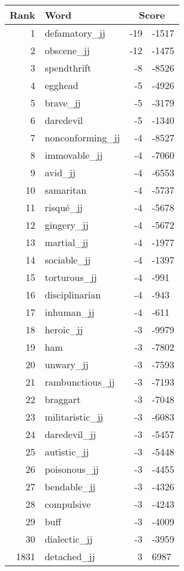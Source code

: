 \begin{longtable}[!htbp]{| rlr@{.}l |}
    \hline
    \textbf{Rank} & \textbf{Word} & \multicolumn{2}{c|}{\textbf{Score}} \\
    \hline
    \endhead
    1 & defamatory\_jj & -19 & -1517 \\
    2 & obscene\_jj & -12 & -1475 \\
    3 & spendthrift & -8 & -8526 \\
    4 & egghead & -5 & -4926 \\
    5 & brave\_jj & -5 & -3179 \\
    6 & daredevil & -5 & -1340 \\
    7 & nonconforming\_jj & -4 & -8527 \\
    8 & immovable\_jj & -4 & -7060 \\
    9 & avid\_jj & -4 & -6553 \\
    10 & samaritan & -4 & -5737 \\
    11 & risqué\_jj & -4 & -5678 \\
    12 & gingery\_jj & -4 & -5672 \\
    13 & martial\_jj & -4 & -1977 \\
    14 & sociable\_jj & -4 & -1397 \\
    15 & torturous\_jj & -4 & -991 \\
    16 & disciplinarian & -4 & -943 \\
    17 & inhuman\_jj & -4 & -611 \\
    18 & heroic\_jj & -3 & -9979 \\
    19 & ham & -3 & -7802 \\
    20 & unwary\_jj & -3 & -7593 \\
    21 & rambunctious\_jj & -3 & -7193 \\
    22 & braggart & -3 & -7048 \\
    23 & militaristic\_jj & -3 & -6083 \\
    24 & daredevil\_jj & -3 & -5457 \\
    25 & autistic\_jj & -3 & -5448 \\
    26 & poisonous\_jj & -3 & -4455 \\
    27 & bendable\_jj & -3 & -4326 \\
    28 & compulsive & -3 & -4243 \\
    29 & buff & -3 & -4009 \\
    30 & dialectic\_jj & -3 & -3959 \\
    1831 & detached\_jj & 3 & 6987 \\

\end{longtable}
